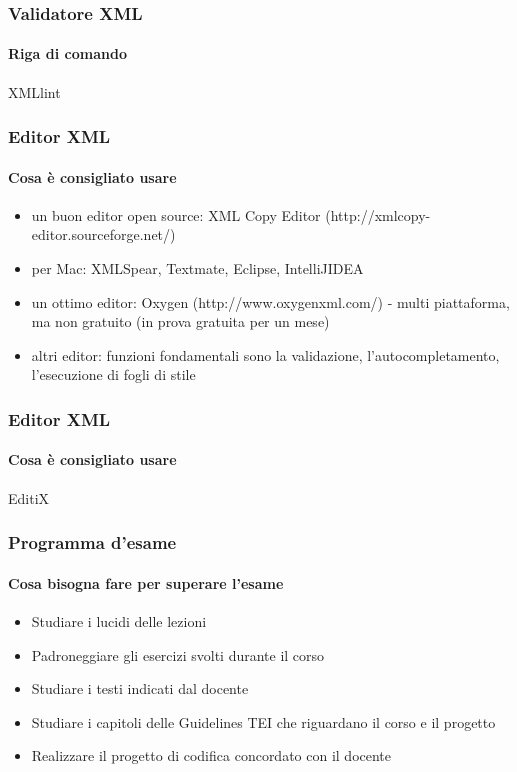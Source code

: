 \begin{frame}
	\frametitle{Validatore XML}
	\framesubtitle{Riga di comando}
	\addtocounter{nframe}{1}

	\begin{block}{XMLlint}

	\end{block}

\end{frame}

\begin{frame}
	\frametitle{Editor XML}
	\framesubtitle{Cosa è consigliato usare}
	\addtocounter{nframe}{1}

	\begin{itemize}
		\item un buon editor open source: XML Copy Editor (http://xmlcopy-editor.sourceforge.net/)
		\item per Mac: XMLSpear, Textmate, Eclipse, IntelliJIDEA
		\item un ottimo editor: Oxygen (http://www.oxygenxml.com/) - multi piattaforma, ma non gratuito (in prova gratuita per un mese)
		\item altri editor: funzioni fondamentali sono la validazione, l’autocompletamento, l’esecuzione di fogli di stile
	\end{itemize}

\end{frame}

\begin{frame}
	\frametitle{Editor XML}
	\framesubtitle{Cosa è consigliato usare}
	\addtocounter{nframe}{1}

	\begin{block}{EditiX}

	\end{block}

\end{frame}

\begin{frame}
	\frametitle{Programma d’esame}
	\framesubtitle{Cosa bisogna fare per superare l'esame}
	\addtocounter{nframe}{1}

	\begin{itemize}
		\item Studiare i lucidi delle lezioni
		\item Padroneggiare gli esercizi svolti durante il corso
		\item Studiare i testi indicati dal docente
		\item Studiare i capitoli delle Guidelines TEI che riguardano il corso e il progetto
		\item Realizzare il progetto di codifica concordato con il docente
	\end{itemize}

\end{frame}

